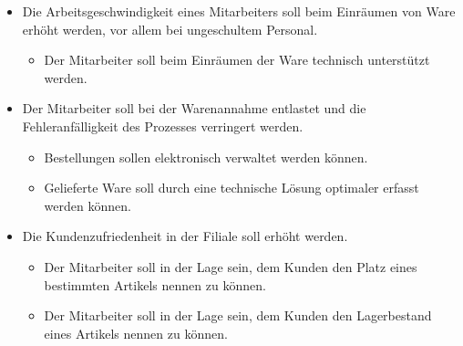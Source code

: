 \begin{itemize}
	\item Die Arbeitsgeschwindigkeit eines Mitarbeiters soll beim Einräumen von Ware erhöht werden, vor allem bei ungeschultem Personal.
	\begin{itemize}
		\item Der Mitarbeiter soll beim Einräumen der Ware technisch unterstützt werden.
	\end{itemize}
	\item Der Mitarbeiter soll bei der Warenannahme entlastet und die Fehleranfälligkeit des Prozesses verringert werden.
	\begin{itemize}
		\item Bestellungen sollen elektronisch verwaltet werden können.
		\item Gelieferte Ware soll durch eine technische Lösung optimaler erfasst werden können.
	\end{itemize}
	\item Die Kundenzufriedenheit in der Filiale soll erhöht werden.
	\begin{itemize}
		\item Der Mitarbeiter soll in der Lage sein, dem Kunden den Platz eines bestimmten Artikels nennen zu können.
		\item Der Mitarbeiter soll in der Lage sein, dem Kunden den Lagerbestand eines Artikels nennen zu können. 
	\end{itemize}
\end{itemize}
